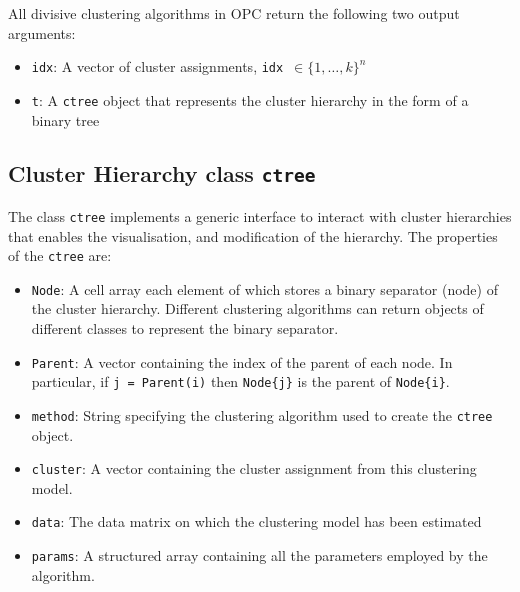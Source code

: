 \documentclass{book}
\begin{document}
All divisive clustering algorithms in OPC return the following two output arguments:
%
\begin{itemize}

\item[] {\tt idx}: A vector of cluster assignments, {\tt idx}~$\in \{1,\ldots,k\}^n$

\item[] {\tt t}: A {\tt ctree} object that represents the cluster hierarchy in the form of a binary tree

\end{itemize}

\subsection*{Cluster Hierarchy class {\tt ctree}}

The class {\tt ctree} implements a generic interface to interact with cluster
hierarchies that enables the visualisation, and modification of the hierarchy.
%
The properties of the {\tt ctree} are:
%
\begin{itemize}

\item {\tt Node}: A cell array each element of which stores a binary separator (node) of the
cluster hierarchy. Different clustering algorithms can return objects of different classes
to represent the binary separator.

\item {\tt Parent}: A vector containing the index of the parent of each node. In particular, if {\tt j = Parent(i)} then
{\tt Node\{j\}} is the parent of {\tt Node\{i\}}. 
%

\item {\tt method}: String specifying the clustering algorithm used to create the {\tt ctree} object.

\item {\tt cluster}: A vector containing the cluster assignment from this clustering model.

\item {\tt data}: The data matrix on which the clustering model has been estimated

\item {\tt params}: A structured array containing all the parameters employed by the
algorithm.

\end{itemize}
\end{document}
